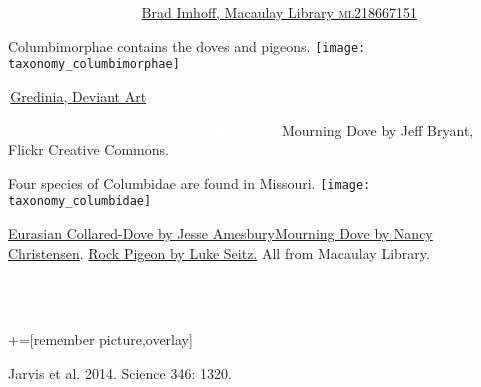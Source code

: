 \documentclass[t]{beamer}
\begin{document}
{
\begin{frame}[b]


	\tinyfill \textcolor{white}{Pied-Billed Grebe by  \href{https://macaulaylibrary.org/asset/218667151}{Brad Imhoff, Macaulay Library \textsc{ml218667151}}}
\end{frame}
}


\begin{frame}[t]{Columbimorphae contains the doves and pigeons.}
\centering
\texttt{[image: taxonomy\_columbimorphae]}

\vfilll

\tinyfill \textcopyright\,\href{https://www.deviantart.com/gredinia/art/Bird-cladistic-Columbimorphae-diversity-705097984}{Gredinia, Deviant Art}
\end{frame}




{
\begin{frame}[b,plain]{\textcolor{white}{Columbiformes has one family, \textcolor{orange4}{Columbidae.}}}
	\tiny\hfill Mourning Dove by Jeff Bryant, Flickr Creative Commons.
\end{frame}
}

\begin{frame}[t]{Four species of Columbidae are found in Missouri.}
\vspace{-0.5\baselineskip}
\centering
\texttt{[image: taxonomy\_columbidae]}

\vfilll

\tiny \href{https://macaulaylibrary.org/asset/45325741}{Eurasian Collared-Dove by Jesse Amesbury}\hfill \href{https://macaulaylibrary.org/asset/50824121}{Mourning Dove by Nancy Christensen}. \hfill \href{https://macaulaylibrary.org/asset/61674401}{Rock Pigeon by Luke Seitz.}  All from Macaulay Library.
\end{frame}

{
\begin{frame}[b,plain]{\hfill\textcolor{white}{Everything else belongs to Passerea.}}
	\tiny\textcolor{white}{American Coot by Mike Baird, Flickr Creative Commons.}
\end{frame}
}

{
{	+=[remember picture,overlay]
\begin{frame}[b, plain]

	\tiny\hfill Jarvis et al. 2014. Science 346: 1320.
\end{frame}
}}
\end{document}
